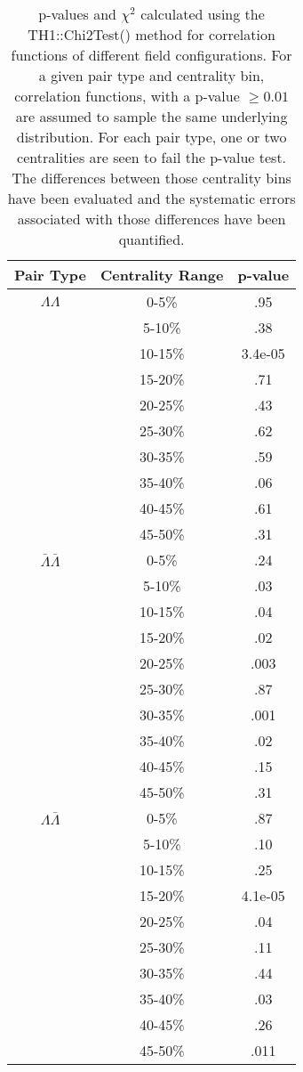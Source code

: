 \begin{table}
\begin{center}
\begin{tabular}{| c | c | c |}
  \hline                       
  Pair Type & Centrality Range & p-value \\
  \hline
  $\Lambda\Lambda$ & 0-5\% & .95  \\
   & 5-10\%  & .38 \\
   & 10-15\% & 3.4e-05 \\
   & 15-20\% & .71 \\
   & 20-25\% & .43 \\
   & 25-30\% & .62 \\
   & 30-35\% & .59 \\
   & 35-40\% & .06 \\
   & 40-45\% & .61 \\
   & 45-50\% & .31 \\
   \hline
  $\bar{\Lambda}\bar{\Lambda}$ &  0-5\% & .24 \\
   & 5-10\% & .03 \\
   & 10-15\% & .04 \\
   & 15-20\% & .02 \\
   & 20-25\% & .003 \\
   & 25-30\% & .87 \\
   & 30-35\% & .001 \\
   & 35-40\% & .02 \\
   & 40-45\% & .15 \\
   & 45-50\% & .31 \\
   \hline
  $\Lambda\bar{\Lambda}$ &  0-5\% & .87 \\
   & 5-10\% & .10 \\
   & 10-15\% & .25 \\
   & 15-20\% & 4.1e-05 \\
   & 20-25\% & .04 \\
   & 25-30\% & .11 \\
   & 30-35\% & .44 \\
   & 35-40\% & .03 \\
   & 40-45\% & .26 \\
   & 45-50\% & .011 \\
  \hline  
\end{tabular}
\label{tab:FieldPvalues}
\caption{p-values and $\chi^2$ calculated using the TH1::Chi2Test() method for correlation functions of different field configurations.  
For a given pair type and centrality bin, correlation functions, with a p-value $\geq 0.01$ are assumed to sample the same underlying distribution.  
For each pair type, one or two centralities are seen to fail the p-value test.  
The differences between those centrality bins have been evaluated and the systematic errors associated with those differences have been quantified.}
\end{center}
\end{table}



